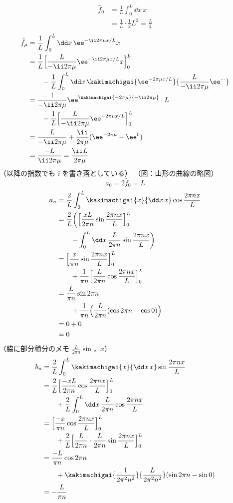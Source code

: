 \begin{align*}
  \hat{f}_0&=\frac{1}{L}\int_{0}^{L}\dd x\,x\\
  &=\frac{1}{L}\cdot\frac{1}{2}L^{2}=\frac{L}{2}
\end{align*}
\begin{align*}
  \hat{f}_{\mu}&=\frac{1}{L}\int_{0}^{L}\dd x\,\ee^{-\ii2\pi\mu x/L}x\\
  &=\frac{1}{L}\Bigl[\frac{L}{-\ii2\pi\mu}\ee^{-\ii2\pi\mu x/L}x\Bigr]_{0}^{L}\\
  &\qquad-\frac{1}{L}\int_{0}^{L}\dd x\,\kakimachigai{\ee^{-2\pi\mu x/L}}{\frac{L}{-\ii2\pi\mu}\ee^{\cdots}}\\
  &=\frac{1}{-\ii2\pi\mu}\ee^{\kakimachigai{-2\pi\mu}{-\ii2\pi\mu}}\cdot L\\
  &\qquad-\frac{1}{L}\Bigl[\frac{L}{-\ii2\pi\mu}\ee^{-2\pi\mu x/L}\Bigr]_{0}^{L}\\
  &=\frac{L}{-\ii2\pi\mu}+\frac{\ii}{2\pi\mu}(\ee^{-2\pi\mu}-\ee^{0})\\
  &=\frac{-L}{\ii2\pi\mu}=\frac{\ii L}{2\pi\mu}
\end{align*}
（以降の指数でも $\ii$ を書き落としている）
（図：山形の曲線の略図）
\[ a_0=2\hat{f}_0=L \]
\begin{align*}
  a_n&=\frac{2}{L}\int_{0}^{L}\kakimachigai{x}{\dd x\,x}\cos\frac{2\pi nx}{L}\\
  &=\frac{2}{L}\biggl(\Bigl[\frac{xL}{2\pi n}\sin\frac{2\pi nx}{L}\Bigr]_{0}^{L}\\
  &\qquad-\int_{0}^{L}\dd x\,\frac{L}{2\pi n}\sin\frac{2\pi nx}{L}\biggr)\\
  &=\Bigl[\frac{x}{\pi n}\sin\frac{2\pi nx}{L}\Bigr]_{0}^{L}\\
  &\qquad+\frac{1}{\pi n}\Bigl[\frac{L}{2\pi n}\cos\frac{2\pi nx}{L}\Bigr]_{0}^{L}\\
  &=\frac{L}{\pi n}\sin2\pi n\\
  &\qquad+\frac{1}{\pi n}\Bigl(\frac{L}{2\pi n}(\cos2\pi n-\cos0)\Bigr)\\
  &=0+0\\
  &=0
\end{align*}
（脇に部分積分のメモ $\frac{L}{2\pi n}\sin$，$x$）
\begin{align*}
  b_n&=\frac{2}{L}\int_{0}^{L}\kakimachigai{x}{\dd x\,x}\sin\frac{2\pi nx}{L}\\
  &=\frac{2}{L}\Bigl[\frac{-xL}{2\pi n}\cos\frac{2\pi nx}{L}\Bigr]_{0}^{L}\\
  &\qquad+\frac{2}{L}\int_{0}^{L}\dd x\,\frac{L}{2\pi n}\cos\frac{2\pi nx}{L}\\
  &=\Bigl[\frac{-x}{\pi n}\cos\frac{2\pi nx}{L}\Bigr]_{0}^{L}\\
  &\qquad+\frac{2}{L}\Bigl[\frac{L}{2\pi n}\cdot\frac{L}{2\pi n}\sin\frac{2\pi nx}{L}\Bigr]_{0}^{L}\\
  &=\frac{-L}{\pi n}\cos2\pi n\\
  &\qquad+\kakimachigai{\frac{1}{2\pi^{2}n^{2}}}{\frac{L}{2\pi^{2}n^{2}}}(\sin2\pi n-\sin0)\\
  &=-\frac{L}{\pi n}
\end{align*}
